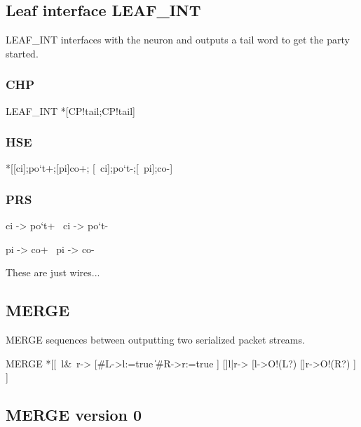 \documentclass{article}
\begin{document}
\subsection{Leaf interface LEAF\_INT}

LEAF\_INT interfaces with the neuron and outputs a tail word to get the party started.

\subsubsection*{CHP}
\begin{csp}
LEAF_INT\equiv
  *[C\star\!P!\textrm{tail};C\star\!P!\textrm{tail}]
\end{csp}

\subsubsection*{HSE}
\begin{hse}
*[[ci];{po}`t+;[pi]co+;
  [~ci];{po}`t-;[~pi];co-]
\end{hse}

\subsubsection*{PRS}
\begin{prs2}
ci -> {po}`t+
~ci -> {po}`t-

pi -> co+
~pi -> co-
\end{prs2}

\noindent These are just wires...

\subsection{MERGE}

MERGE sequences between outputting two serialized packet streams.

\begin{csp}
MERGE\equiv
  *[[~l&~r->
      [#{L}->l:=true
      \|#{R}->r:=true
      ]
    []l|r->
      [l->O!(L?)
      []r->O!(R?)
    ]
  ]
\end{csp}

\subsection{MERGE version 0}
\end{document}
